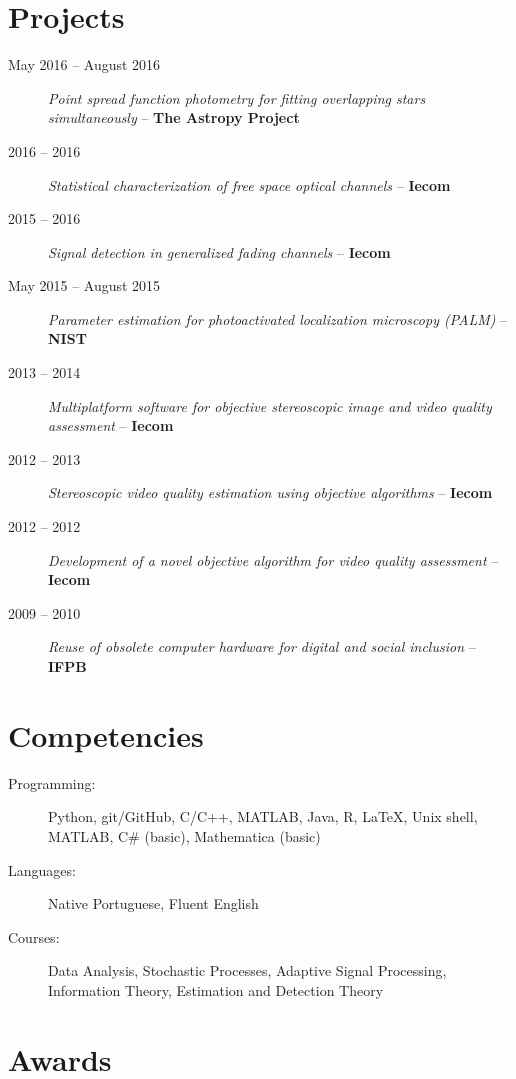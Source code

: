 \documentclass[10pt]{article}
\begin{document}
\begin{titlepage}
\section{Projects}
\begin{description}
\item[May 2016 -- August 2016] \emph{Point spread function photometry for fitting overlapping stars simultaneously} -- \textbf{The Astropy Project}
\item[2016 -- 2016] \emph{Statistical characterization of free space optical channels} -- \textbf{Iecom}
\item[2015 -- 2016] \emph{Signal detection in generalized fading channels} -- \textbf{Iecom}
\item[May 2015 -- August 2015] \emph{Parameter estimation for photoactivated localization microscopy (PALM)} -- \textbf{NIST}
\item[2013 -- 2014] \emph{Multiplatform software for objective stereoscopic image and video quality assessment} -- \textbf{Iecom}
\item[2012 -- 2013] \emph{Stereoscopic video quality estimation using objective algorithms} -- \textbf{Iecom}
\item[2012 -- 2012] \emph{Development of a novel objective algorithm for video quality assessment} -- \textbf{Iecom}
\item[2009 -- 2010] \emph{Reuse of obsolete computer hardware for digital and social inclusion} -- \textbf{IFPB}
\end{description}

\section{Competencies}
\begin{description}
    \item[Programming:] Python, git/GitHub, C/C++, MATLAB, Java, R, LaTeX, Unix shell, MATLAB, C\# (basic), Mathematica (basic)
    \item[Languages:] Native Portuguese, Fluent English
    \item[Courses:]  Data Analysis, Stochastic Processes, Adaptive Signal Processing, Information Theory, Estimation and Detection Theory
\end{description}

\section{Awards}


\end{titlepage}
\end{document}
